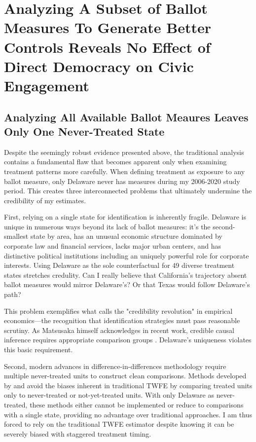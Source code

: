 \documentclass[12pt,letterpaper,oneside]{book}
\begin{document}
\section{Analyzing A Subset of Ballot Measures To Generate Better Controls Reveals No Effect of Direct Democracy on Civic Engagement}

\subsection{Analyzing All Available Ballot Meaures Leaves Only One Never-Treated State}

Despite the seemingly robust evidence presented above, the traditional analysis contains a fundamental flaw that becomes apparent only when examining treatment patterns more carefully. When defining treatment as exposure to any ballot measure, only Delaware never has measures during my 2006-2020 study period. This creates three interconnected problems that ultimately undermine the credibility of my estimates.

First, relying on a single state for identification is inherently fragile. Delaware is unique in numerous ways beyond its lack of ballot measures: it's the second-smallest state by area, has an unusual economic structure dominated by corporate law and financial services, lacks major urban centers, and has distinctive political institutions including an uniquely powerful role for corporate interests. Using Delaware as the sole counterfactual for 49 diverse treatment states stretches credulity. Can I really believe that California's trajectory absent ballot measures would mirror Delaware's? Or that Texas would follow Delaware's path?

This problem exemplifies what \citet{abadie2021using} calls the "credibility revolution" in empirical economics—the recognition that identification strategies must pass reasonable scrutiny. As Matsusaka himself acknowledges in recent work, credible causal inference requires appropriate comparison groups \citep{matsusaka2018public}. Delaware's uniqueness violates this basic requirement.

Second, modern advances in difference-in-differences methodology require multiple never-treated units to construct clean comparisons. Methods developed by \citet{sun2021estimating} and \citet{callaway2021difference} avoid the biases inherent in traditional TWFE by comparing treated units only to never-treated or not-yet-treated units. With only Delaware as never-treated, these methods either cannot be implemented or reduce to comparisons with a single state, providing no advantage over traditional approaches. I am thus forced to rely on the traditional TWFE estimator despite knowing it can be severely biased with staggered treatment timing.
\end{document}
